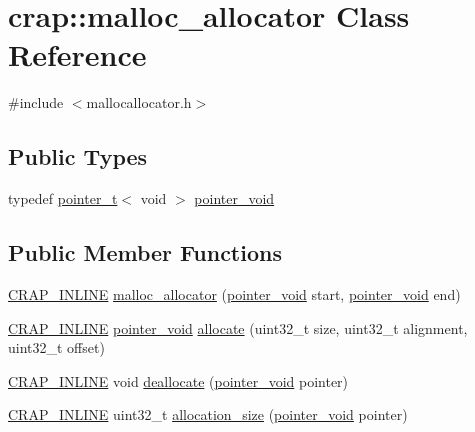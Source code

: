 \hypertarget{classcrap_1_1malloc__allocator}{\section{crap\+:\+:malloc\+\_\+allocator Class Reference}
\label{classcrap_1_1malloc__allocator}
}


{\ttfamily \#include $<$mallocallocator.\+h$>$}

\subsection*{Public Types}
\begin{DoxyCompactItemize}
\item 
typedef \hyperlink{structcrap_1_1pointer__t}{pointer\+\_\+t}$<$ void $>$ \hyperlink{classcrap_1_1malloc__allocator_a9e5d7117b39a74b329c4921a3658e1f3}{pointer\+\_\+void}
\end{DoxyCompactItemize}
\subsection*{Public Member Functions}
\begin{DoxyCompactItemize}
\item 
\hyperlink{config__x86_8h_a5a40526b8d842e7ff731509998bb0f1c}{C\+R\+A\+P\+\_\+\+I\+N\+L\+I\+N\+E} \hyperlink{classcrap_1_1malloc__allocator_a76d0d7444b136b8f4b96e9e7d53aae73}{malloc\+\_\+allocator} (\hyperlink{classcrap_1_1malloc__allocator_a9e5d7117b39a74b329c4921a3658e1f3}{pointer\+\_\+void} start, \hyperlink{classcrap_1_1malloc__allocator_a9e5d7117b39a74b329c4921a3658e1f3}{pointer\+\_\+void} end)
\item 
\hyperlink{config__x86_8h_a5a40526b8d842e7ff731509998bb0f1c}{C\+R\+A\+P\+\_\+\+I\+N\+L\+I\+N\+E} \hyperlink{classcrap_1_1malloc__allocator_a9e5d7117b39a74b329c4921a3658e1f3}{pointer\+\_\+void} \hyperlink{classcrap_1_1malloc__allocator_a7f94e6d7f20e95fb53f7736b44bf20a9}{allocate} (uint32\+\_\+t size, uint32\+\_\+t alignment, uint32\+\_\+t offset)
\item 
\hyperlink{config__x86_8h_a5a40526b8d842e7ff731509998bb0f1c}{C\+R\+A\+P\+\_\+\+I\+N\+L\+I\+N\+E} void \hyperlink{classcrap_1_1malloc__allocator_a992362ce820e00fb866e2a0f3a4a4f63}{deallocate} (\hyperlink{classcrap_1_1malloc__allocator_a9e5d7117b39a74b329c4921a3658e1f3}{pointer\+\_\+void} pointer)
\item 
\hyperlink{config__x86_8h_a5a40526b8d842e7ff731509998bb0f1c}{C\+R\+A\+P\+\_\+\+I\+N\+L\+I\+N\+E} uint32\+\_\+t \hyperlink{classcrap_1_1malloc__allocator_a2cdde6f48fdde99c21c7dd8a440f853d}{allocation\+\_\+size} (\hyperlink{classcrap_1_1malloc__allocator_a9e5d7117b39a74b329c4921a3658e1f3}{pointer\+\_\+void} pointer)
\end{DoxyCompactItemize}


